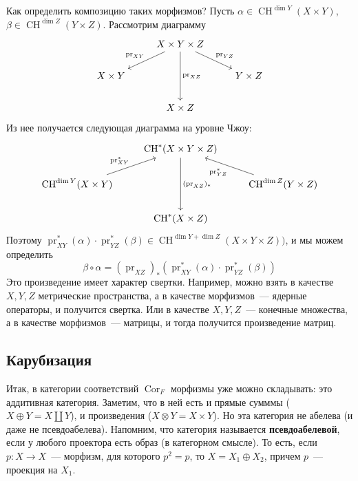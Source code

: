 \documentclass[a4paper]{article}
\DeclareMathOperator{\CH}{CH}
\DeclareMathOperator{\Cor}{Cor}
\DeclareMathOperator{\pr}{pr}
\newcommand{\term}{\textbf}
\theoremstyle{definition}
\begin{document}
Как определить композицию таких морфизмов?
Пусть $\alpha\in\CH^{\dim Y}(X\times Y)$, $\beta\in\CH^{\dim Z}(Y\times Z)$.
Рассмотрим диаграмму
\[
\begin{tikzcd}
& X\times Y\times Z \arrow{dl}[swap]{\pr_{XY}} \arrow{dr}{\pr_{YZ}}
\arrow{dd}{\pr_{XZ}} \\
X\times Y & & Y\times Z\\
& X\times Z
\end{tikzcd}
\]
Из нее получается следующая диаграмма на уровне Чжоу:
\[
\begin{tikzcd}
& \CH^*(X\times Y\times Z)
\arrow{dd}{(\pr_{XZ})_*} \\
\CH^{\dim Y}(X\times Y)\arrow{ur}{\pr_{XY}^*}
& & \CH^{\dim Z}(Y\times Z)\arrow{ul}{\pr_{YZ}^*}\\
& \CH^{*}(X\times Z)
\end{tikzcd}
\]
Поэтому
$\pr_{XY}^*(\alpha)\cdot\pr_{YZ}^*(\beta)
\in\CH^{\dim Y + \dim Z}(X\times Y\times Z))$, и
мы можем определить
\[
\beta\circ\alpha = (\pr_{XZ})_*(\pr_{XY}^*(\alpha)\cdot\pr_{YZ}^*(\beta))
\]
Это произведение имеет характер свертки.
Например, можно взять в качестве $X,Y,Z$ метрические пространства,
а в качестве морфизмов~--- ядерные операторы,
и получится свертка.
Или в качестве $X,Y,Z$~--- конечные множества, а в качестве морфизмов~---
матрицы, и тогда получится произведение матриц.

\subsection{Карубизация}

Итак, в категории соответствий $\Cor_F$ морфизмы уже можно складывать:
это аддитивная категория.
Заметим, что в ней есть и прямые сумммы
($X\oplus Y = X\coprod Y$), и произведения ($X\otimes Y = X\times Y$).
Но эта категория не абелева (и даже не псевдоабелева).
Напомним, что категория называется \term{псевдоабелевой}, если
у любого проектора есть образ (в категорном смысле).
То есть, если $p\colon X\to X$~--- морфизм, для которого $p^2=p$,
то $X = X_1\oplus X_2$, причем $p$~--- проекция на $X_1$.
\end{document}
